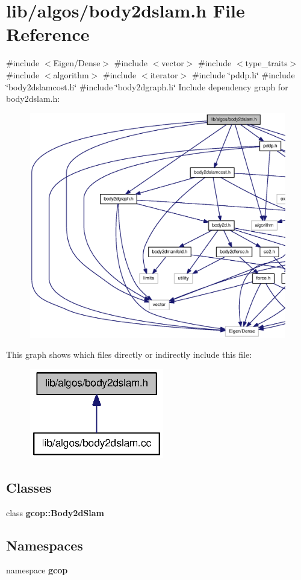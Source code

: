 \section{lib/algos/body2dslam.h \-File \-Reference}
\label{body2dslam_8h}
{\ttfamily \#include $<$\-Eigen/\-Dense$>$}\*
{\ttfamily \#include $<$vector$>$}\*
{\ttfamily \#include $<$type\-\_\-traits$>$}\*
{\ttfamily \#include $<$algorithm$>$}\*
{\ttfamily \#include $<$iterator$>$}\*
{\ttfamily \#include \char`\"{}pddp.\-h\char`\"{}}\*
{\ttfamily \#include \char`\"{}body2dslamcost.\-h\char`\"{}}\*
{\ttfamily \#include \char`\"{}body2dgraph.\-h\char`\"{}}\*
\-Include dependency graph for body2dslam.\-h\-:
\nopagebreak
\begin{figure}[H]
\begin{center}
\leavevmode
\includegraphics[width=350pt]{body2dslam_8h__incl}
\end{center}
\end{figure}
\-This graph shows which files directly or indirectly include this file\-:
\nopagebreak
\begin{figure}[H]
\begin{center}
\leavevmode
\includegraphics[width=166pt]{body2dslam_8h__dep__incl}
\end{center}
\end{figure}
\subsection*{\-Classes}
\begin{DoxyCompactItemize}
\item 
class {\bf gcop\-::\-Body2d\-Slam}
\end{DoxyCompactItemize}
\subsection*{\-Namespaces}
\begin{DoxyCompactItemize}
\item 
namespace {\bf gcop}
\end{DoxyCompactItemize}
